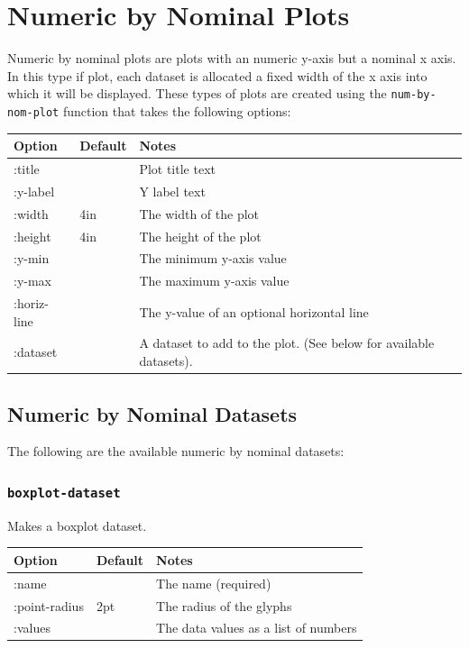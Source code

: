 \documentclass{article}
\begin{document}
\section{\label{sect:num-by-nom} Numeric by Nominal Plots}

Numeric by nominal plots are plots with an numeric y-axis but a
nominal x axis.  In this type if plot, each dataset is allocated a
fixed width of the x axis into which it will be displayed.  These
types of plots are created using the {\tt num-by-nom-plot} function
that takes the following options:


\begin{center}
\begin{tabular}{lll}
Option & Default & Notes \\
\hline
:title & & Plot title text\\
:y-label & & Y label text\\
:width & 4in & The width of the plot\\
:height & 4in & The height of the plot\\
:y-min & & The minimum y-axis value\\
:y-max & & The maximum y-axis value\\
:horiz-line & & The y-value of an optional horizontal line\\
:dataset & & A dataset to add to the plot.  (See below for available
datasets).\\
\end{tabular}
\end{center}

\subsection{Numeric by Nominal Datasets}

The following are the available numeric by nominal datasets:

\subsubsection{\tt boxplot-dataset}

Makes a boxplot dataset.

\begin{center}
\begin{tabular}{lll}
Option & Default & Notes \\
\hline
:name & & The name (required)\\
:point-radius & 2pt & The radius of the glyphs\\
:values & & The data values as a list of numbers\\
\end{tabular}
\end{center}
\end{document}
